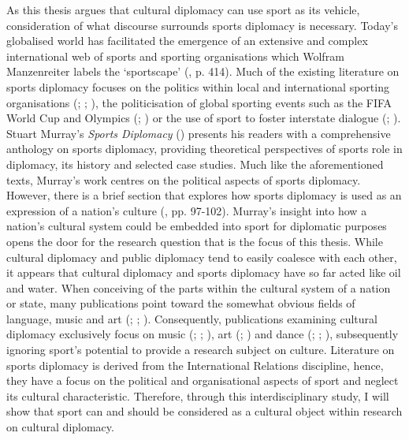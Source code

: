 As this thesis argues that cultural diplomacy can use sport as its vehicle, consideration of what discourse surrounds sports diplomacy is necessary. Today’s globalised world has facilitated the emergence of an extensive and complex international web of sports and sporting organisations which Wolfram Manzenreiter labels the ‘sportscape’ (\citeyear{manzenreiter2008}, p. 414). Much of the existing literature on sports diplomacy focuses on the politics within local and international sporting organisations (\cite{holt1999}; \cite{tomlinson2016}; \cite{cooley2018}), the politicisation of global sporting events such as the FIFA World Cup and Olympics (\cite{xu2008}; \cite{dowse2018}) or the use of sport to foster interstate dialogue (\cite{rowe2018}; \cite{shuman2018}). Stuart Murray’s \textit{Sports Diplomacy} (\citeyear{murray2018}) presents his readers with a comprehensive anthology on sports diplomacy, providing theoretical perspectives of sports role in diplomacy, its history and selected case studies. Much like the aforementioned texts, Murray’s work centres on the political aspects of sports diplomacy. However, there is a brief section that explores how sports diplomacy is used as an expression of a nation’s culture (\citeyear{murray2018}, pp. 97-102). Murray’s insight into how a nation’s cultural system could be embedded into sport for diplomatic purposes opens the door for the research question that is the focus of this thesis. While cultural diplomacy and public diplomacy tend to easily coalesce with each other, it appears that cultural diplomacy and sports diplomacy have so far acted like oil and water. When conceiving of the parts within the cultural system of a nation or state, many publications point toward the somewhat obvious fields of language, music and art (\cite{hanna1987}; \cite{blackingetal1995}; \cite{clifford1998}). Consequently, publications examining cultural diplomacy exclusively focus on music (\cite{fosler-lussier2015}; \cite{mikkonensuutari2016}; \cite{saito2020}), art (\cite{barnhisel2015}; \cite{mikkonensuutari2016}) and dance (\cite{prevots1998}; \cite{kodat2014}; \cite{mcdaniel2014}), subsequently ignoring sport’s potential to provide a research subject on culture. Literature on sports diplomacy is derived from the International Relations discipline, hence, they have a focus on the political and organisational aspects of sport and neglect its cultural characteristic. Therefore, through this interdisciplinary study, I will show that sport can and should be considered as a cultural object within research on cultural diplomacy.

